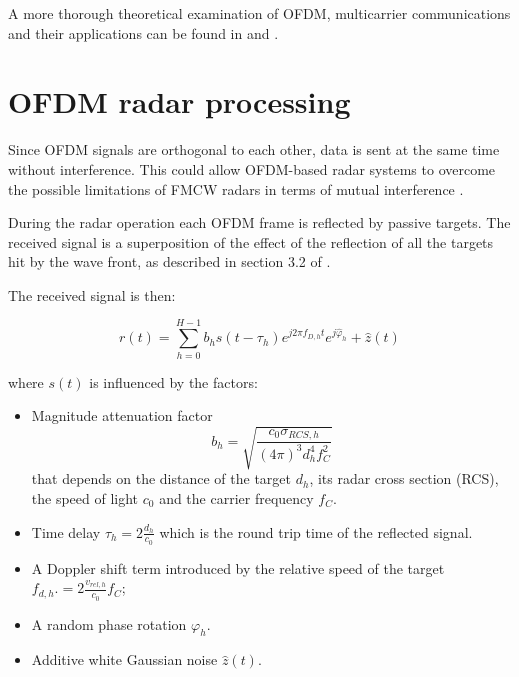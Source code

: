 A more thorough theoretical examination of OFDM, multicarrier communications and their applications can be found in \cite{OFDMWireless} and \cite{Proakis_2001}.


\section{OFDM radar processing}
    
    Since OFDM signals are orthogonal to each other, data is sent at the same time without interference. This could allow OFDM-based radar systems to overcome the possible limitations of FMCW radars in terms of mutual interference \cite{Goppelt_Blöcher_Menzel_2010}.
    
    During the radar operation each OFDM frame is reflected by passive targets. The received signal is a superposition of the effect of the reflection of all the targets hit by the wave front, as described in section 3.2 of \cite{Braun2014OFDMRA}.
    
    The received signal is then:
    
    \begin{equation}
    \label{eq:received_signal_mltiple_targets}
        r(t) = \sum_{h=0}^{H-1} b_h s(t-\tau_h)e^{j2\pi f_{D,h}t}e^{j\hat{\varphi}_h} + \hat{z}(t)
    \end{equation}
    
    where $s(t)$ is influenced by the factors:
    
    \begin{itemize}
        \item Magnitude attenuation factor $$b_h = \sqrt{\frac{c_0\sigma_{RCS,h}}{(4\pi)^3 d_h^4f_C^2}}$$
    that depends on the distance of the target $d_h$, its radar cross section (RCS), the speed of light $c_0$ and the carrier frequency $f_C$.
    
        \item Time delay $\tau_h = 2\frac{d_h}{c_0}$ which is the round trip time of the reflected signal.
    
        \item A Doppler shift term introduced by the relative speed of the target $f_{d,h}. = 2 \frac{v_{rel,h}}{c_0}f_C$;
        \item A random phase rotation $\varphi_h$.
        \item Additive white Gaussian noise $\hat{z}(t)$.
    \end{itemize}
    
